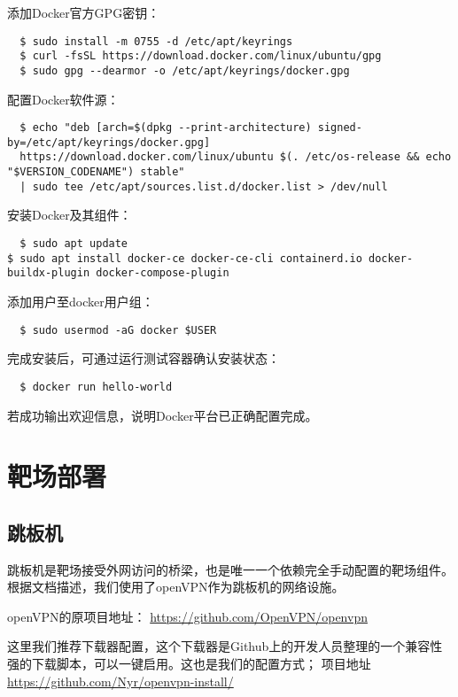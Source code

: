 \documentclass[lang=cn,10pt]{elegantbook}
\begin{document}
添加Docker官方GPG密钥：

\begin{verbatim}
  $ sudo install -m 0755 -d /etc/apt/keyrings
  $ curl -fsSL https://download.docker.com/linux/ubuntu/gpg
  $ sudo gpg --dearmor -o /etc/apt/keyrings/docker.gpg
\end{verbatim}

配置Docker软件源：

\begin{verbatim}
  $ echo "deb [arch=$(dpkg --print-architecture) signed-by=/etc/apt/keyrings/docker.gpg]
  https://download.docker.com/linux/ubuntu $(. /etc/os-release && echo "$VERSION_CODENAME") stable"
  | sudo tee /etc/apt/sources.list.d/docker.list > /dev/null
\end{verbatim}

安装Docker及其组件：

\begin{verbatim}
  $ sudo apt update
$ sudo apt install docker-ce docker-ce-cli containerd.io docker-buildx-plugin docker-compose-plugin
\end{verbatim}

添加用户至docker用户组：

\begin{verbatim}
  $ sudo usermod -aG docker $USER
\end{verbatim}

完成安装后，可通过运行测试容器确认安装状态：

\begin{verbatim}
  $ docker run hello-world
\end{verbatim}

若成功输出欢迎信息，说明Docker平台已正确配置完成。


\section{靶场部署}

\subsection{跳板机}

跳板机是靶场接受外网访问的桥梁，也是唯一一个依赖完全手动配置的靶场组件。根据文档描述，我们使用了openVPN作为跳板机的网络设施。

openVPN的原项目地址：
\href{https://github.com/OpenVPN/openvpn}{https://github.com/OpenVPN/openvpn}

这里我们推荐下载器配置，这个下载器是Github上的开发人员整理的一个兼容性强的下载脚本，可以一键启用。这也是我们的配置方式；
项目地址
\href{https://github.com/Nyr/openvpn-install/}{https://github.com/Nyr/openvpn-install/}
\end{document}
